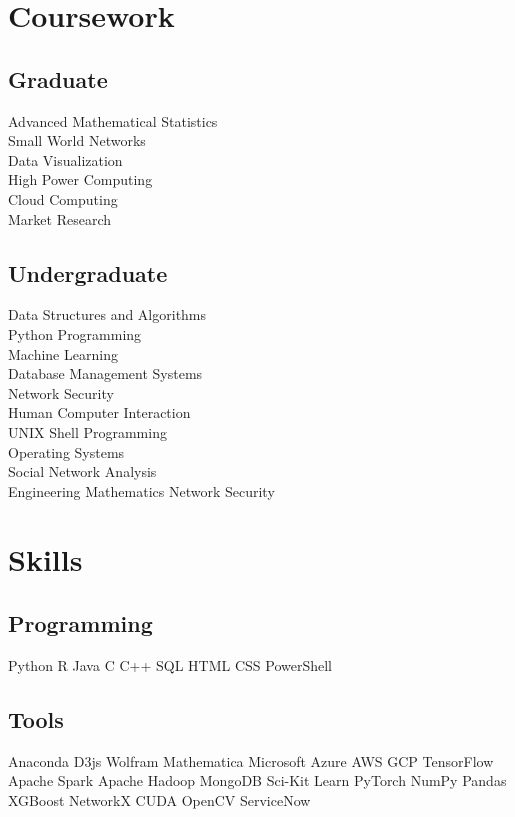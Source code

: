\documentclass[]{deedy-resume-openfont}
\begin{document}
\begin{minipage}[t]{0.33\textwidth}

\section{Coursework}
\subsection{Graduate}
Advanced Mathematical Statistics \\
Small World Networks \\
Data Visualization \\
High Power Computing \\
Cloud Computing \\
Market Research\\
\sectionsep

\subsection{Undergraduate}
Data Structures and Algorithms \\
Python Programming\\
Machine Learning\\
Database Management Systems \\
Network Security\\
Human Computer Interaction\\
UNIX Shell Programming\\
Operating Systems\\
Social Network Analysis\\
Engineering Mathematics
Network Security \\


\section{Skills}
\subsection{Programming}
Python \textbullet{}   R \textbullet{} Java \textbullet{} C \textbullet{} C++\textbullet{} SQL \textbullet{} HTML \textbullet{} CSS \textbullet{} PowerShell
\subsection{Tools}
Anaconda \textbullet{} D3js \textbullet{} Wolfram Mathematica \textbullet{}  Microsoft Azure \textbullet{} AWS \textbullet{} GCP \textbullet{} TensorFlow \textbullet{} Apache Spark \textbullet{} Apache Hadoop \textbullet{} MongoDB \textbullet{} Sci-Kit Learn \textbullet{} \textbullet{} PyTorch \textbullet{} NumPy \textbullet{} Pandas \textbullet{} XGBoost \textbullet{} NetworkX \textbullet{} CUDA \textbullet{} OpenCV \textbullet{} ServiceNow
\sectionsep


\end{minipage}
\end{document}
